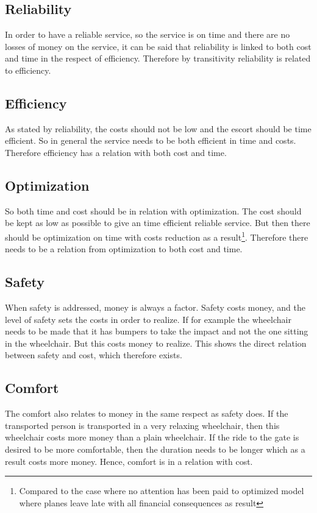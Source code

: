 \documentclass[a4paper, 11pt, notitlepage]{report}
\begin{document}
\subsection{Reliability}
In order to have a reliable service, so the service is on time and there are no losses of money on the service, it can be said that reliability is linked to both cost and time in the respect of efficiency. Therefore by transitivity reliability is related to efficiency.
\subsection{Efficiency}
As stated by reliability, the costs should not be low and the escort should be time efficient. So in general the service needs to be both efficient in time and costs. Therefore efficiency has a relation with both cost and time.
\subsection{Optimization}
So both time and cost should be in relation with optimization. The cost should be kept as low as possible to give an time efficient reliable service. But then there should be optimization on time with costs reduction as a result\footnote{Compared to the case where no attention has been paid to optimized model where planes leave late with all financial consequences as result}. Therefore there needs to be a relation from optimization to both cost and time.
\subsection{Safety}
When safety is addressed, money is always a factor. Safety costs money, and the level of safety sets the costs in order to realize. If for example the wheelchair needs to be made that it has bumpers to take the impact and not the one sitting in the wheelchair. But this costs money to realize. This shows the direct relation between safety and cost, which therefore exists.
\subsection{Comfort}
The comfort also relates to money in the same respect as safety does. If the transported person is transported in a very relaxing wheelchair, then this wheelchair costs more money than a plain wheelchair. If the ride to the gate is desired to be more comfortable, then the duration needs to be longer which as a result costs more money. Hence, comfort is in a relation with cost.
\end{document}

